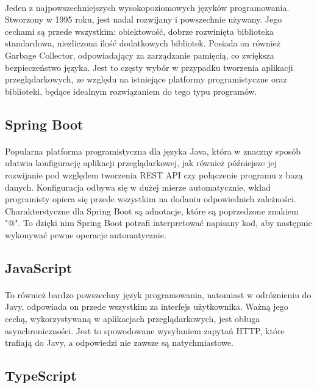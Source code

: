 \paragraph{}
Jeden z najpowszechniejszych wysokopoziomowych języków programowania. Stworzony w 1995 roku, jest nadal rozwijany i powszechnie używany. Jego cechami są przede wszystkim: obiektowość, dobrze rozwinięta biblioteka standardowa, niezliczona ilość dodatkowych bibliotek. Posiada on również Garbage Collector, odpowiadający za zarządzanie pamięcią, co zwiększa bezpieczeństwo języka. Jest to częsty wybór w przypadku tworzenia aplikacji przeglądarkowych, ze względu na istniejące platformy programistyczne oraz biblioteki, będące idealnym rozwiązaniem do tego typu programów.

\subsection{Spring Boot}
\paragraph{}
Popularna platforma programistyczna dla języka Java, która w znaczny sposób ułatwia konfigurację aplikacji przeglądarkowej, jak również późniejsze jej rozwijanie pod względem tworzenia REST API czy połączenie programu z bazą danych. Konfiguracja odbywa się w dużej mierze automatycznie, wkład programisty opiera się przede wszystkim na dodaniu odpowiednich zależności. Charakterstyczne dla Spring Boot są adnotacje, które są poprzedzone znakiem "@". To dzięki nim Spring Boot potrafi interpretować napisany kod, aby następnie wykonywać pewne operacje automatycznie.

\subsection{JavaScript}
\paragraph{}
To również bardzo powszechny język programowania, natomiast w odróznieniu do Javy, odpowiada on przede wszystkim za interfejs użytkownika. Ważną jego cechą, wykorzystywaną w aplikacjach przeglądarkowych, jest obługa asynchroniczności. Jest to spowodowane wysyłaniem zapytań HTTP, które trafiają do Javy, a odpowiedzi nie zawsze są natychmiastowe.

\subsection{TypeScript}
